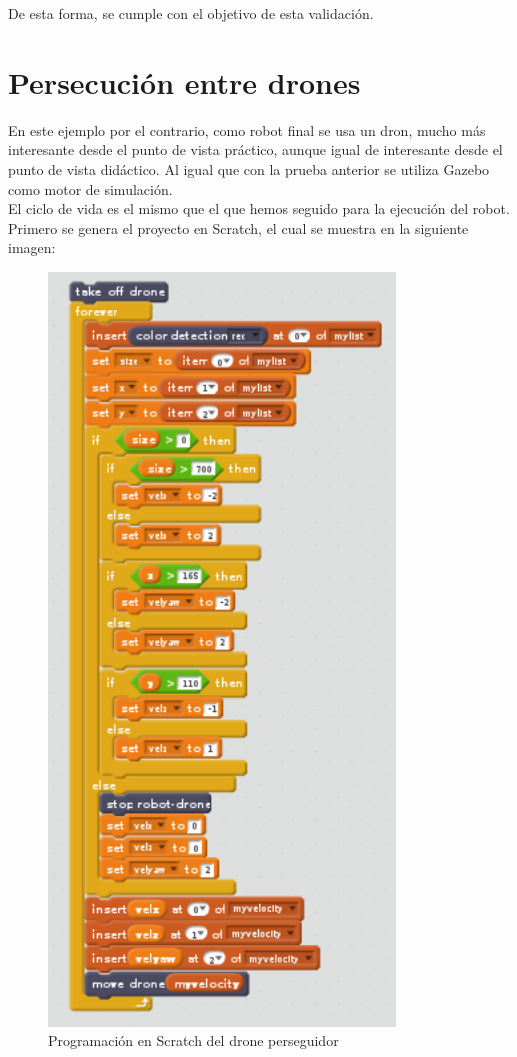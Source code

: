 De esta forma, se cumple con el objetivo de esta validación. 


\section{Persecución entre drones}
\label{sec:persecucion-drones}

En este ejemplo por el contrario, como robot final se usa un dron, mucho más interesante desde el punto de vista práctico, aunque igual de interesante desde el punto de vista didáctico. Al igual que con la prueba anterior se utiliza Gazebo como motor de simulación.\\

El ciclo de vida es el mismo que el que hemos seguido para la ejecución del robot. Primero se genera el proyecto en Scratch, el cual se muestra en la siguiente imagen:\\

\begin{figure}[H]
    \centering
    \includegraphics[scale=0.75]{img/cat-drone-scratch.PNG}
  	\caption{Programación en Scratch del drone perseguidor}
  	\label{fig:drone-perse}
\end{figure}

